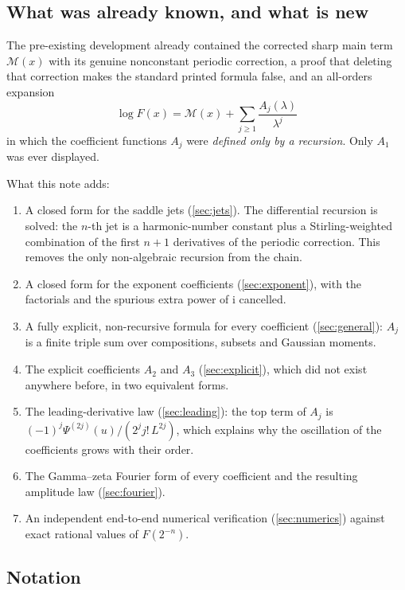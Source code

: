 \documentclass[11pt,oneside]{article}
\theoremstyle{definition}
\theoremstyle{remark}
\newcommand{\ii}{\mathrm i}
\begin{document}
\subsection{What was already known, and what is new}

The pre-existing development already contained the corrected sharp main term
$\mathcal M(x)$ with its genuine nonconstant periodic correction, a proof that
deleting that correction makes the standard printed formula false, and an
all-orders expansion
\[
  \log F(x)=\mathcal M(x)+\sum_{j\ge1}\frac{A_j(\lambda)}{\lambda^j}
\]
in which the coefficient functions $A_j$ were \emph{defined only by a
recursion}.  Only $A_1$ was ever displayed.

What this note adds:

\begin{enumerate}
\item A closed form for the saddle jets (\cref{sec:jets}).  The differential
  recursion is solved: the $n$-th jet is a harmonic-number constant plus a
  Stirling-weighted combination of the first $n+1$ derivatives of the periodic
  correction.  This removes the only non-algebraic recursion from the chain.
\item A closed form for the exponent coefficients (\cref{sec:exponent}), with
  the factorials and the spurious extra power of $\ii$ cancelled.
\item A fully explicit, non-recursive formula for every coefficient
  (\cref{sec:general}): $A_j$ is a finite triple sum over compositions, subsets
  and Gaussian moments.
\item The explicit coefficients $A_2$ and $A_3$ (\cref{sec:explicit}), which did
  not exist anywhere before, in two equivalent forms.
\item The leading-derivative law (\cref{sec:leading}): the top term of $A_j$ is
  $(-1)^j\Psi^{(2j)}(u)/(2^jj!\,L^{2j})$, which explains why the oscillation of
  the coefficients grows with their order.
\item The Gamma--zeta Fourier form of every coefficient and the resulting
  amplitude law (\cref{sec:fourier}).
\item An independent end-to-end numerical verification (\cref{sec:numerics})
  against exact rational values of $F(2^{-n})$.
\end{enumerate}

\subsection{Notation}
\end{document}
